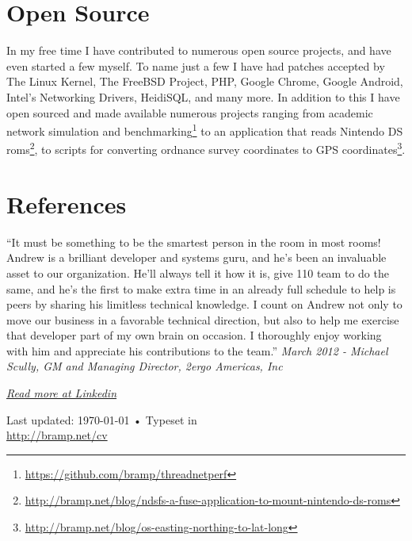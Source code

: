 \documentclass[a4paper,10pt]{article}
\begin{document}
\section{Open Source}
 In my free time I have contributed to numerous open source projects, and have even started a few myself. To name just a few I have had patches accepted by 
The Linux Kernel, The FreeBSD Project, PHP, Google Chrome, Google Android, Intel's Networking Drivers, HeidiSQL, and many more. In addition to this I have open sourced and made 
available numerous projects ranging from academic network simulation and benchmarking\footnote{\href{https://github.com/bramp/threadnetperf}{https://github.com/bramp/threadnetperf}} to an application that reads Nintendo DS 
roms\footnote{\href{http://bramp.net/blog/ndsfs-a-fuse-application-to-mount-nintendo-ds-roms}{http://bramp.net/blog/ndsfs-a-fuse-application-to-mount-nintendo-ds-roms}}, 
to scripts for converting ordnance survey coordinates to GPS 
coordinates\footnote{\href{http://bramp.net/blog/os-easting-northing-to-lat-long}{http://bramp.net/blog/os-easting-northing-to-lat-long}}.

\section{References}
“It must be something to be the smartest person in the room in most rooms! Andrew is a brilliant developer and systems guru, and he's been 
an invaluable asset to our organization. He'll always tell it how it is, give 110%
team to do the same, and he's the first to make extra time in an already full schedule to help is peers by sharing his limitless technical knowledge. I count on 
Andrew not only to move our business in a favorable technical direction, but also to help me exercise that developer part of my own brain on occasion. I 
thoroughly enjoy working with him and appreciate his contributions to the team.” {\it March 2012 - Michael Scully, GM and Managing Director, 2ergo Americas, Inc}

{\it \href{http://www.linkedin.com/in/bramp}{Read more at Linkedin}}



\newpage
\renewcommand\refname{Publications}


\vfill{}

\begin{center}
{\scriptsize  Last updated: \today\- •\- 
Typeset in \XeLaTeX\\
\href{http://bramp.net/cv}{http://bramp.net/cv}}
\end{center}
\end{document}
